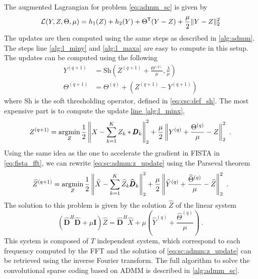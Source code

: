 \documentclass[../thesis.tex]{subfiles}
\begin{document}
The augmented Lagrangian for problem \autoref{eq:admm_sc} is given by
%
\begin{equation}
	\mathcal L(Y, Z, \Theta, \mu) = h_1(Z) + h_2(Y) +
	\Theta^\mathsf{T}(Y-Z) + \frac{\mu}{2} \|Y-Z\|_2^2
\end{equation}
%
The updates are then computed using the same steps as described in \autoref{alg:admm}. The steps line \autoref{alg:l_miny} and \autoref{alg:l_maxa} are easy to compute in this setup. The updates can be computed using the following
%
\begin{align}
	\label{eq:admm1}
	Y^{(q+1)} &= \text{Sh}\left(Z^{(q+1)} + \frac{\Theta^{(q)}}{\mu}, \frac{\lambda}{\mu}\right)\\
	\label{eq:admm2}
	\Theta^{(q+1)} &= \Theta^{(q)} + \left(Z^{(q+1)} - Y^{(q+1)}\right)
\end{align}
%
where $\text{Sh}$ is the soft thresholding operator, defined in \autoref{eq:csc:def_sh}. The most expensive part is to compute the update \hyperref[alg:l_minx]{line~\ref*{alg:l_minx}},
%
\begin{equation}
	\label{eq:sc:admm:z_update}
	Z^{(q+1)} = \operatorname*{\arg\!\min}_{Z} \frac{1}{2}\left\|X - \sum_{k=1}^KZ_k*{\pmb D}_k\right\|_2^2
			  + \frac{\mu}{2} \left\|Y^{(q)} + \frac{\Theta^{(q)}}{\mu} - Z \right\|_2^2~.
\end{equation}
%
Using the same idea as the one to accelerate the gradient in FISTA in \autoref{eq:fista_fft}, we can rewrite \autoref{eq:sc:admm:z_update} using the Parseval theorem
%
\[
	\widehat Z^{(q+1)} = \operatorname*{\arg\!\min}_{Z}
		\frac{1}{2}\left\|\widehat X - \sum_{k=1}^K\widehat Z_k\widehat {\pmb D}_k\right\|_2^2
			  + \frac{\mu}{2} \left\|\widehat Y^{(q)}
			  + \frac{\widehat\Theta^{(q)}}{\mu} - \widehat Z \right\|_2^2~.
\]
%
The solution to this problem is given by the solution $\widehat Z$ of the linear system
%
\begin{equation}
	\label{eq:admm:z_update}
	\left(\widehat {\pmb D}^{H}\widehat {\pmb D} + \mu \pmb I\right)\widehat Z =
			\widehat {\pmb D}^H \widehat X + \mu \left(\widehat Y^{(q)}
			+ \frac{\widehat \Theta^{(q)}}{\mu}\right)~.
\end{equation}
%
This system is composed of $T$ independent system, which correspond to each frequency computed by the FFT and the solution of \autoref{eq:sc:admm:z_update} can be retrieved using the inverse Fourier transform. The full algorithm to solve the convolutional sparse coding based on ADMM is described in \autoref{alg:admm_sc}.
\end{document}

